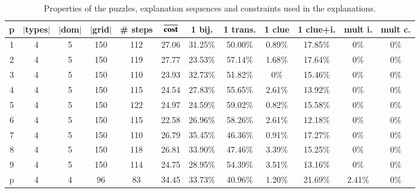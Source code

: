 \begin{table}[t]
	\centering
	\begin{tabular}{c|ccc|cc|cccccc}
		\textbf{p} & \textbf{$|$types$|$} & \textbf{$|$dom$|$} & \textbf{$|$grid$|$} & \textbf{\# steps} & $\overline{\text{\textbf{cost}}}$ & \textbf{1 bij.} & \textbf{1 trans.} & \textbf{1 clue} & \textbf{1 clue+i.}  & \textbf{mult i.} & \textbf{mult c.} \\\hline
		1 &       4 &            5 &         150 &    112 &      27.06 &  31.25\% &  50.00\% &    0.89\% &        17.85\%   &  0\%  &  0\%  \\
		2 &       4 &            5 &         150 &    119 &      27.77 &  23.53\% &  57.14\% &    1.68\% &        17.64\%   &  0\%  &  0\%  \\
		3 &       4 &            5 &         150 &    110 &      23.93 &  32.73\% &  51.82\% &    0\% &        15.46\%   &  0\%  &  0\%  \\
		4 &       4 &            5 &         150 &    115 &      24.54 &  27.83\% &  55.65\% &    2.61\% &        13.92\%   &  0\%  &  0\%  \\
		5 &       4 &            5 &         150 &    122 &      24.97 &  24.59\% &  59.02\% &    0.82\% &        15.58\%   &  0\%  &  0\%  \\
		6 &       4 &            5 &         150 &    115 &      22.58 &  26.96\% &  58.26\% &    2.61\% &        12.18\%   &  0\%  &  0\%  \\
		7 &       4 &            5 &         150 &    110 &      26.79 &  35.45\% &  46.36\% &    0.91\% &        17.27\%   &  0\%  &  0\%  \\
		8 &       4 &            5 &         150 &    118 &      26.81 &  33.90\% &  47.46\% &    3.39\% &        15.25\%   &  0\%  &  0\%  \\
		9 &       4 &            5 &         150 &    114 &      24.75 &  28.95\% &  54.39\% &    3.51\% &        13.16\%   &  0\%  &  0\%  \\
		p &       4 &            4 &          96 &     83 &      34.45 &  33.73\% &  40.96\% &    1.20\% &        21.69\%   &  2.41\%  &  0\%
	\end{tabular}
	\caption{Properties of the puzzles, explanation sequences and constraints used in the explanations.}
	\label{table:composition}
\end{table}


